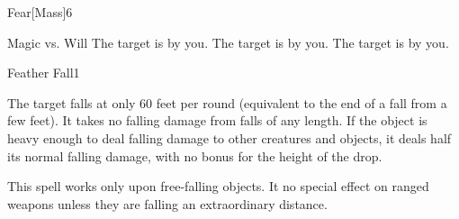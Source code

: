 \begin{spellsection}{Fear}[Mass]{6}
\begin{spellheader}
\end{spellheader}
\begin{spellcontent}
    \begin{spelltargetinginfo}
    \end{spelltargetinginfo}
    \begin{spelleffects}
        \begin{spellattack}{Magic vs. Will}
            \spellsuccess The target is \frightened by you.
            \spellcritical The target is \panicked by you.
            \spellfailure The target is \shaken by you.
        \end{spellattack}
        \spelldur \durshort \dismissable
    \end{spelleffects}
\end{spellcontent}
\begin{spellfooter}
\end{spellfooter}
\end{spellsection}

\begin{spellsection}{Feather Fall}{1}
\begin{spellheader}
\end{spellheader}
\begin{spellcontent}
    \begin{spelltargetinginfo}
        \spellrng{\rngmed}
    \end{spelltargetinginfo}
    \begin{spelleffects}
        \spelleffect The target falls at only 60 feet per round (equivalent to the end of a fall from a few feet). It takes no falling damage from falls of any length. If the object is heavy enough to deal falling damage to other creatures and objects, it deals half its normal falling damage, with no bonus for the height of the drop.
        \spelldur \durshort
    \end{spelleffects}
\end{spellcontent}
\begin{spellfooter}
    \spellnotes This spell works only upon free-falling objects. It no special effect on ranged weapons unless they are falling an extraordinary distance.
\end{spellfooter}
\end{spellsection}

